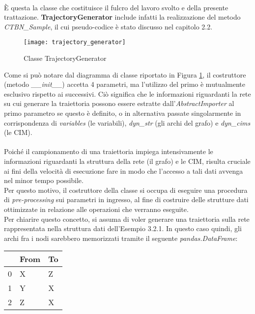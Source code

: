   \paragraph{}
  È questa la classe che costituisce il fulcro del lavoro svolto e della presente trattazione.
  \textbf{TrajectoryGenerator} include infatti la realizzazione del metodo 
  \textit{CTBN\_Sample}, il cui pseudo-codice è stato discusso nel capitolo 2.2.
  
  \begin{figure}[H]
    \texttt{[image: trajectory\_generator]}
    \centering
    \caption{Classe TrajectoryGenerator}
    \label{fig:trajectory_generator}
  \end{figure}

  Come si può notare dal diagramma di classe riportato in Figura \ref{fig:trajectory_generator}, il costruttore (metodo \textit{\_\_init\_\_})
  accetta 4 parametri, ma l'utilizzo del primo è mutualmente esclusivo rispetto ai successivi. Ciò significa 
  che le informazioni riguardanti la rete su cui generare la traiettoria possono essere estratte dall'\textit{AbstractImporter}
  al primo parametro se questo è definito, o in alternativa passate singolarmente in corrispondenza di \textit{variables} (le variabili),
  \textit{dyn\_str} (gli archi del grafo) e \textit{dyn\_cims} (le CIM).
  
  \paragraph{}
  Poiché il campionamento di una traiettoria impiega intensivamente le informazioni riguardanti
  la struttura della rete (il grafo) e le CIM, risulta cruciale ai fini della velocità di esecuzione
  fare in modo che l'accesso a tali dati avvenga nel minor tempo possibile.\\
  Per questo motivo, il costruttore della classe si occupa di eseguire una procedura di \textit{pre-processing} 
  sui parametri in ingresso, al fine di costruire delle strutture dati ottimizzate in relazione alle operazioni che verranno eseguite.\\
  Per chiarire questo concetto, si assuma di voler generare una traiettoria sulla rete rappresentata
  nella struttura dati dell'Esempio 3.2.1. In questo caso quindi, gli archi fra i nodi
  sarebbero memorizzati tramite il seguente \textit{pandas.DataFrame}:
  
  \begin{center}
    \begin{tabular}{lll}
      \toprule
      {} & From & To \\   
      \midrule
      0 & X & Z \\  
      1 & Y & X \\  
      2 & Z & X \\    
      \bottomrule
    \end{tabular} 
  \end{center} 

